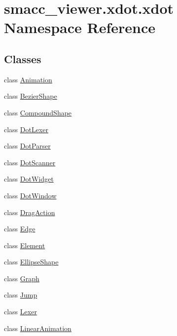 \hypertarget{namespacesmacc__viewer_1_1xdot_1_1xdot}{}\section{smacc\+\_\+viewer.\+xdot.\+xdot Namespace Reference}
\label{namespacesmacc__viewer_1_1xdot_1_1xdot}
\subsection*{Classes}
\begin{DoxyCompactItemize}
\item 
class \hyperlink{classsmacc__viewer_1_1xdot_1_1xdot_1_1Animation}{Animation}
\item 
class \hyperlink{classsmacc__viewer_1_1xdot_1_1xdot_1_1BezierShape}{Bezier\+Shape}
\item 
class \hyperlink{classsmacc__viewer_1_1xdot_1_1xdot_1_1CompoundShape}{Compound\+Shape}
\item 
class \hyperlink{classsmacc__viewer_1_1xdot_1_1xdot_1_1DotLexer}{Dot\+Lexer}
\item 
class \hyperlink{classsmacc__viewer_1_1xdot_1_1xdot_1_1DotParser}{Dot\+Parser}
\item 
class \hyperlink{classsmacc__viewer_1_1xdot_1_1xdot_1_1DotScanner}{Dot\+Scanner}
\item 
class \hyperlink{classsmacc__viewer_1_1xdot_1_1xdot_1_1DotWidget}{Dot\+Widget}
\item 
class \hyperlink{classsmacc__viewer_1_1xdot_1_1xdot_1_1DotWindow}{Dot\+Window}
\item 
class \hyperlink{classsmacc__viewer_1_1xdot_1_1xdot_1_1DragAction}{Drag\+Action}
\item 
class \hyperlink{classsmacc__viewer_1_1xdot_1_1xdot_1_1Edge}{Edge}
\item 
class \hyperlink{classsmacc__viewer_1_1xdot_1_1xdot_1_1Element}{Element}
\item 
class \hyperlink{classsmacc__viewer_1_1xdot_1_1xdot_1_1EllipseShape}{Ellipse\+Shape}
\item 
class \hyperlink{classsmacc__viewer_1_1xdot_1_1xdot_1_1Graph}{Graph}
\item 
class \hyperlink{classsmacc__viewer_1_1xdot_1_1xdot_1_1Jump}{Jump}
\item 
class \hyperlink{classsmacc__viewer_1_1xdot_1_1xdot_1_1Lexer}{Lexer}
\item 
class \hyperlink{classsmacc__viewer_1_1xdot_1_1xdot_1_1LinearAnimation}{Linear\+Animation}

\end{DoxyCompactItemize}
